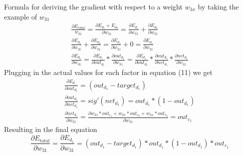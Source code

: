 \documentclass[11pt, halfparskip]{article}
\begin{document}
\newpage %
\noindent Formula for deriving the gradient with respect to a weight $w_{3x}$ by taking the example of $w_{31}$
    \begin{gather}
	\frac{\partial E_{total}}{w_{31}} = \frac{\partial E_{d_1} + E_{d_2}}{\partial w_{31}} = \frac{\partial E_{d_1}}{\partial w_{31}} + \frac{\partial E_{d_2}}{\partial w_{31}}\\[1em]
	\frac{\partial E_{d_1}}{\partial w_{31}} + \frac{\partial E_{d_2}}{\partial w_{31}} = \frac{\partial E_{d_1}}{\partial w_{31}} + 0 = \frac{\partial E_{d_1}}{\partial w_{31}}\\[1em]
	\frac{\partial E_{d_1}}{\partial w_{31}} = \frac{\partial E_{d_1}}{\partial out_{d_1}} * \frac{\partial out_{d_1}}{\partial w_{31}} = \frac{\partial E_{d_1}}{\partial out_{d_1}} * 			\frac{\partial out_{d_1}}{\partial net_{d_1}} * \frac{\partial net_{d_1}}{\partial w_{31}}
    \end{gather}
Plugging in the actual values for each factor in equation (11) we get
    \begin{gather}
    	\frac{\partial E_{d_1}}{\partial out_{d_1}} = (out_{d_1} - target_{d_1})\\[1em]
    	\frac{\partial out_{d_1}}{\partial net_{d_1}} = sig'(net_{d_1}) = out_{d_1} * (1 - out_{d_1})\\[1em]
    	\frac{\partial net_{d_1}}{\partial w_{31}} = \frac{\partial w_{31} * out_{c_1} + w_{3x} * out_{c_2} + w_{3x} * out_{c_3}}{\partial w_{31}} = out_{c_1}
    \end{gather}
Resulting in the final equation
    \begin{equation}
    	\frac{\partial E_{total}}{\partial w_{31}} = \frac{\partial E_{d_1}}{\partial w_{31}} = (out_{d_1} - target_{d_1}) * out_{d_1} * (1 - out_{d_1}) * out_{c_1}
    \end{equation}
    
    
    
\end{document}
